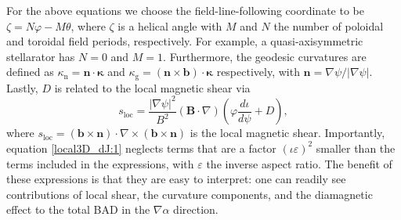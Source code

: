 For the above equations we choose the field-line-following coordinate to be $\zeta = N\varphi - M\theta$, where $\zeta$ is a helical angle with $M$ and $N$ the number of poloidal and toroidal field periods, respectively. For example, a quasi-axisymmetric stellarator has $N=0$ and $M=1$. Furthermore, the geodesic curvatures are defined as $\kappa_{\mathrm{n}} = \mathbf{n} \cdot \bm{\kappa}$ and $\kappa_{\mathrm{g}} = \left(\mathbf{n} \times \mathbf{b} \right) \cdot \bm{\kappa}$ respectively, with $\mathbf{n} = \nabla \psi /|\nabla \psi|$. Lastly, $D$ is related to the local magnetic shear via
\begin{equation}
s_\mathrm{loc} = \frac{|\nabla \psi|^2}{B^2} \left(\bm{B}\cdot\nabla\right) \left( \varphi\frac{d\iota}{d\psi} + D \right), \label{local3D_D_and_sloc}
\end{equation}
where $s_\mathrm{loc} = (\mathbf{b} \times \mathbf{n}) \cdot \nabla \times (\mathbf{b} \times \mathbf{n}) $ is the local magnetic shear. Importantly, equation \eqref{local3D_dJ:1} neglects terms that are a factor $(\iota\varepsilon)^2$ smaller than the terms included in the expressions, with $\varepsilon$ the inverse aspect ratio. The benefit of these expressions is that they are easy to interpret: one can readily see contributions of local shear, the curvature components, and the diamagnetic effect to the total BAD in the $\nabla\alpha$ direction.
